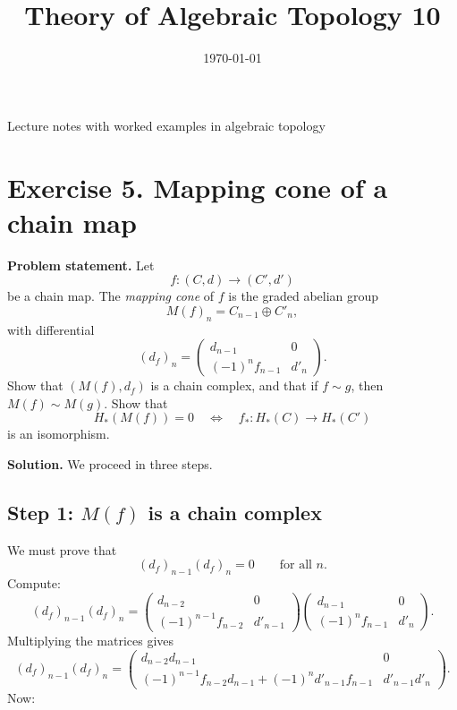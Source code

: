 \documentclass[12pt,a4paper]{article}
\title{\vspace{-1.5em}\bfseries Theory of Algebraic Topology 10}
\author{}
\date{\today}
\theoremstyle{notespace}
\begin{document}
	\maketitle
	\thispagestyle{plain}
		\begin{center}
		\begin{minipage}{0.92\textwidth}
			Lecture notes with worked examples in algebraic topology
		\end{minipage}
	\end{center}
		\tableofcontents
	\clearpage


\section{Exercise 5. Mapping cone of a chain map}

\textbf{Problem statement.}
Let
\[
f:(C,d)\to (C',d')
\]
be a chain map. The \emph{mapping cone} of \(f\) is the graded abelian group
\[
M(f)_n=C_{n-1}\oplus C'_n,
\]
with differential
\[
(d_f)_n=
\begin{pmatrix}
	d_{n-1} & 0\\
	(-1)^n f_{n-1} & d'_n
\end{pmatrix}.
\]
Show that \((M(f),d_f)\) is a chain complex, and that if \(f\sim g\), then \(M(f)\sim M(g)\). Show that
\[
H_*(M(f))=0
\quad\Longleftrightarrow\quad
f_*:H_*(C)\to H_*(C')
\]
is an isomorphism.

\medskip
\textbf{Solution.}
We proceed in three steps.

\subsection{Step 1: \(M(f)\) is a chain complex}

We must prove that
\[
(d_f)_{n-1}(d_f)_n=0
\qquad\text{for all }n.
\]
Compute:
\[
(d_f)_{n-1}(d_f)_n
=
\begin{pmatrix}
	d_{n-2} & 0\\
	(-1)^{n-1}f_{n-2} & d'_{n-1}
\end{pmatrix}
\begin{pmatrix}
	d_{n-1} & 0\\
	(-1)^n f_{n-1} & d'_n
\end{pmatrix}.
\]
Multiplying the matrices gives
\[
(d_f)_{n-1}(d_f)_n
=
\begin{pmatrix}
	d_{n-2}d_{n-1} & 0\\[1mm]
	(-1)^{n-1}f_{n-2}d_{n-1}+(-1)^n d'_{n-1}f_{n-1} & d'_{n-1}d'_n
\end{pmatrix}.
\]
Now:
\end{document}
